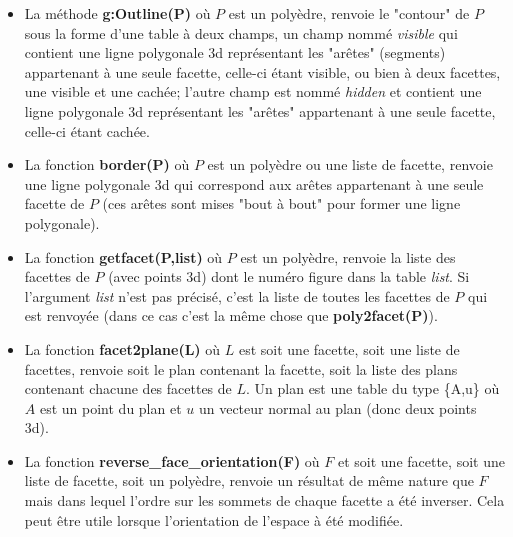 \begin{itemize}
    \item La méthode \textbf{g:Outline(P)} où $P$ est un polyèdre, renvoie le "contour" de $P$ sous la forme d'une table à deux champs, un champ nommé \emph{visible} qui contient une ligne polygonale 3d représentant les "arêtes" (segments) appartenant à une seule facette, celle-ci étant visible, ou bien à deux facettes, une visible et une cachée; l'autre champ est nommé \emph{hidden} et contient une ligne polygonale 3d représentant les "arêtes" appartenant à une seule facette, celle-ci étant cachée.
    
    \item La fonction \textbf{border(P)} où $P$ est un polyèdre ou une liste de facette, renvoie une ligne polygonale 3d qui correspond aux arêtes appartenant à une seule facette de $P$ (ces arêtes sont mises "bout à bout" pour former une ligne polygonale).
    
    \item La fonction \textbf{getfacet(P,list)} où $P$ est un polyèdre, renvoie la liste des facettes de $P$ (avec points 3d) dont le numéro figure dans la table \emph{list}. Si l'argument \emph{list} n'est pas précisé, c'est la liste de toutes les facettes de $P$ qui est renvoyée (dans ce cas c'est la même chose que \textbf{poly2facet(P)}).
    
    \item La fonction \textbf{facet2plane(L)} où $L$ est soit une facette, soit une liste de facettes, renvoie soit le plan contenant la facette, soit la liste des plans contenant chacune des facettes de $L$. Un plan est une table du type \{A,u\} où $A$ est un point du plan et $u$ un vecteur normal au plan (donc deux points 3d).
    
    \item La fonction \textbf{reverse\_face\_orientation(F)} où $F$ et soit une facette, soit une liste de facette, soit un polyèdre, renvoie un résultat de même nature que $F$ mais dans lequel l'ordre sur les sommets de chaque facette a été inverser. Cela peut être utile lorsque l'orientation de l'espace à été modifiée.
    

\end{itemize}
